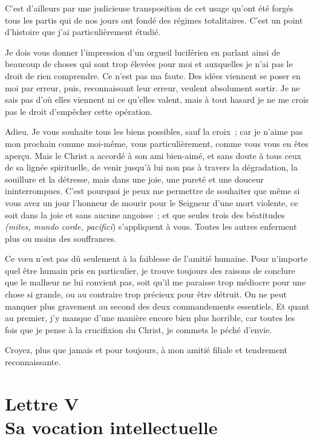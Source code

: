 \documentclass[french,twoside]{book} %
\newcommand{\signed}[1]{\bigbreak\filbreak{\raggedleft #1\par}\medskip}
\newcommand\chapteropen{} %
\newcommand\chapterclose{} %
\begin{document}
C'est d'ailleurs par une judicieuse transposition de cet usage qu'ont été forgés tous les partis qui de nos jours ont fondé des régimes totalitaires. C'est un point d'histoire que j'ai particulièrement étudié.\par
Je dois vous donner l'impression d'un orgueil luciférien en parlant ainsi de beaucoup de choses qui sont trop élevées pour moi et auxquelles je n'ai pas le droit de rien comprendre. Ce n'est pas ma faute. Des idées viennent se poser en moi par erreur, puis, reconnaissant leur erreur, veulent absolument sortir. Je ne sais pas d'où elles viennent ni ce qu'elles valent, mais à tout hasard je ne me crois pas le droit d'empêcher cette opération.\par
Adieu. Je vous souhaite tous les biens possibles, sauf la croix ; car je n'aime pas mon prochain comme moi-même, vous particulièrement, comme vous vous en êtes aperçu. Mais le Christ a accordé à son ami bien-aimé, et sans doute à tous ceux de sa lignée spirituelle, de venir jusqu'à lui non pas à travers la dégradation, la souillure et la détresse, mais dans une joie, une pureté et une douceur ininterrompues. C'est pourquoi je peux me permettre de souhaiter que même si vous avez un jour l'honneur de mourir pour le Seigneur d'une mort violente, ce soit dans la joie et sans aucune angoisse ; et que seules trois des béatitudes {\itshape (mites, mundo corde, pacifici}) s'appliquent à vous. Toutes les autres enferment plus ou moins des souffrances.\par
Ce vœu n'est pas dû seulement à la faiblesse de l'amitié humaine. Pour n'importe quel être humain pris en particulier, je trouve toujours des raisons de conclure que le malheur ne lui convient pas, soit qu'il me paraisse trop médiocre pour une chose si grande, ou au contraire trop précieux pour être détruit. On ne peut manquer plus gravement au second des deux commandements essentiels. Et quant au premier, j'y manque d'une manière encore bien plus horrible, car toutes les fois que je pense à la crucifixion du Christ, je commets le péché d'envie.\par
Croyez, plus que jamais et pour toujours, à mon amitié filiale et tendrement reconnaissante.\par


\signed{SIMONE WEIL.}
\chapterclose


\chapteropen
\chapter[{Lettre V. Sa vocation intellectuelle}]{Lettre V \\
Sa vocation intellectuelle}
\end{document}
